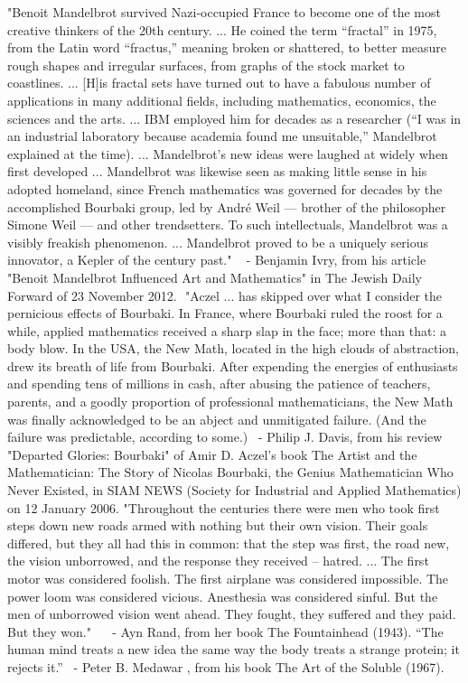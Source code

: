 \documentclass[12pt]{article}
\begin{document}
"Benoit Mandelbrot survived Nazi-occupied France to become one of the most creative thinkers of the 20th century. ... He coined the term “fractal” in 1975, from the Latin word “fractus,” meaning broken or shattered, to better measure rough shapes and irregular surfaces, from graphs of the stock market to coastlines. ... [H]is fractal sets have turned out to have a fabulous number of applications in many additional fields, including mathematics, economics, the sciences and the arts. ... IBM employed him for decades as a researcher (“I was in an industrial laboratory because academia found me unsuitable,” Mandelbrot explained at the time). ... Mandelbrot’s new ideas were laughed at widely when first developed ... Mandelbrot was likewise seen as making little sense in his adopted homeland, since French mathematics was governed for decades by the accomplished Bourbaki group, led by André Weil — brother of the philosopher Simone Weil — and other trendsetters. To such intellectuals, Mandelbrot was a visibly freakish phenomenon. ... Mandelbrot proved to be a uniquely serious innovator, a Kepler of the century past."   - Benjamin Ivry, from his article "Benoit Mandelbrot Influenced Art and Mathematics" in The Jewish Daily Forward of 23 November 2012.  "Aczel ... has skipped over what I consider the pernicious effects of Bourbaki. In France, where Bourbaki ruled the roost for a while, applied mathematics received a sharp slap in the face; more than that: a body blow. In the USA, the New Math, located in the high clouds of abstraction, drew its breath of life from Bourbaki. After expending the energies of enthusiasts and spending tens of millions in cash, after abusing the patience of teachers, parents, and a goodly proportion of professional mathematicians, the New Math was finally acknowledged to be an abject and unmitigated failure. (And the failure was predictable, according to some.)  - Philip J. Davis, from his review "Departed Glories: Bourbaki" of Amir D. Aczel's book The Artist and the Mathematician: The Story of Nicolas Bourbaki, the Genius Mathematician Who Never Existed, in SIAM NEWS (Society for Industrial and Applied Mathematics) on 12 January 2006.
"Throughout the centuries there were men who took first steps down new roads armed with nothing but their own vision. Their goals differed, but they all had this in common: that the step was first, the road new, the vision unborrowed, and the response they received -- hatred. ... The first motor was considered foolish. The first airplane was considered impossible. The power loom was considered vicious. Anesthesia was considered sinful. But the men of unborrowed vision went ahead. They fought, they suffered and they paid. But they won."    - Ayn Rand, from her book The Fountainhead (1943).
“The human mind treats a new idea the same way the body treats a strange protein; it rejects it.”
 - Peter B. Medawar , from his book The Art of the Soluble (1967).
\end{document}
